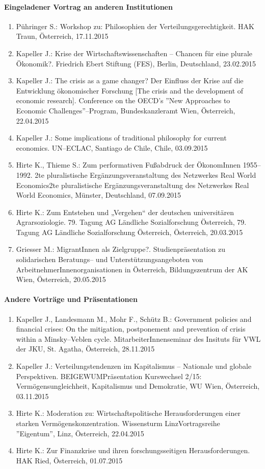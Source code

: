 \paragraph{Eingeladener Vortrag an anderen Institutionen}
\begin{enumerate}
	\item Pühringer S.: Workshop zu: Philosophien der Verteilungsgerechtigkeit. HAK Traun, Österreich, 17.11.2015
	\item Kapeller J.: Krise der Wirtschaftswissenschaften -- Chancen für eine plurale Ökonomik?. Friedrich Ebert Stiftung (FES), Berlin, Deutschland, 23.02.2015
	\item Kapeller J.: The crisis as a game changer? Der Einfluss der Krise auf die Entwicklung ökonomischer Forschung [The crisis and the development of economic research]. Conference on the OECD's ''New Approaches to Economic Challenges''--Program, Bundeskanzleramt Wien, Österreich, 22.04.2015
	\item Kapeller J.: Some implications of traditional philosophy for current economics. UN--ECLAC, Santiago de Chile, Chile, 03.09.2015
	\item Hirte K., Thieme S.: Zum performativen Fußabdruck der ÖkonomInnen 1955--1992. 2te pluralistische Ergänzungsveranstaltung des Netzwerkes Real World Economics2te pluralistische Ergänzungsveranstaltung des Netzwerkes Real World Economics, Münster, Deutschland, 07.09.2015
	\item Hirte K.: Zum Entstehen und „Vergehen“ der deutschen universitären Agrarsoziologie. 79. Tagung AG Ländliche Sozialforschung Österreich, 79. Tagung AG Ländliche Sozialforschung Österreich, Österreich, 20.03.2015
	\item Griesser M.: MigrantInnen als Zielgruppe?. Studienpräsentation zu solidarischen Beratungs-- und Unterstützungsangeboten von ArbeitnehmerInnenorganisationen in Österreich, Bildungszentrum der AK Wien, Österreich, 20.05.2015
\end{enumerate}
\paragraph{Andere Vorträge und Präsentationen}
\begin{enumerate}
	\item Kapeller J., Landesmann M., Mohr F., Schütz B.: Government policies and financial crises: On the mitigation, postponement and prevention of crisis within a Minsky--Veblen cycle. MitarbeiterInnenseminar des Insituts für VWL der JKU, St. Agatha, Österreich, 28.11.2015
	\item Kapeller J.: Verteilungstendenzen im Kapitalismus -- Nationale und globale Perspektiven. BEIGEWUMPräsentation Kurswechsel 2/15: Vermögensungleichheit, Kapitalismus und Demokratie, WU Wien, Österreich, 03.11.2015
	\item Hirte K.: Moderation zu: Wirtschaftspolitische Herausforderungen einer starken Vermögenskonzentration. Wissensturm LinzVortragsreihe ''Eigentum'', Linz, Österreich, 22.04.2015
	\item Hirte K.: Zur Finanzkrise und ihren forschungsseitigen Herausforderungen. HAK Ried, Österreich, 01.07.2015
\end{enumerate}
